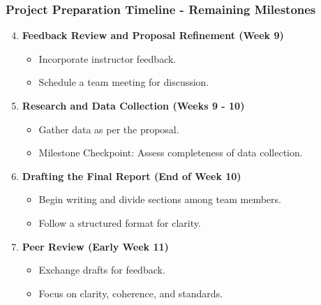\documentclass[aspectratio=169]{beamer}
\begin{document}
\begin{frame}[fragile]
    \frametitle{Project Preparation Timeline - Remaining Milestones}
    \begin{enumerate}
        \setcounter{enumi}{3} %
        
        \item \textbf{Feedback Review and Proposal Refinement (Week 9)}
        \begin{itemize}
            \item Incorporate instructor feedback.
            \item Schedule a team meeting for discussion.
        \end{itemize}
        
        \item \textbf{Research and Data Collection (Weeks 9 - 10)}
        \begin{itemize}
            \item Gather data as per the proposal.
            \item Milestone Checkpoint: Assess completeness of data collection.
        \end{itemize}
        
        \item \textbf{Drafting the Final Report (End of Week 10)}
        \begin{itemize}
            \item Begin writing and divide sections among team members.
            \item Follow a structured format for clarity.
        \end{itemize}
        
        \item \textbf{Peer Review (Early Week 11)}
        \begin{itemize}
            \item Exchange drafts for feedback.
            \item Focus on clarity, coherence, and standards.
        \end{itemize}
    \end{enumerate}
\end{frame}
\end{document}
